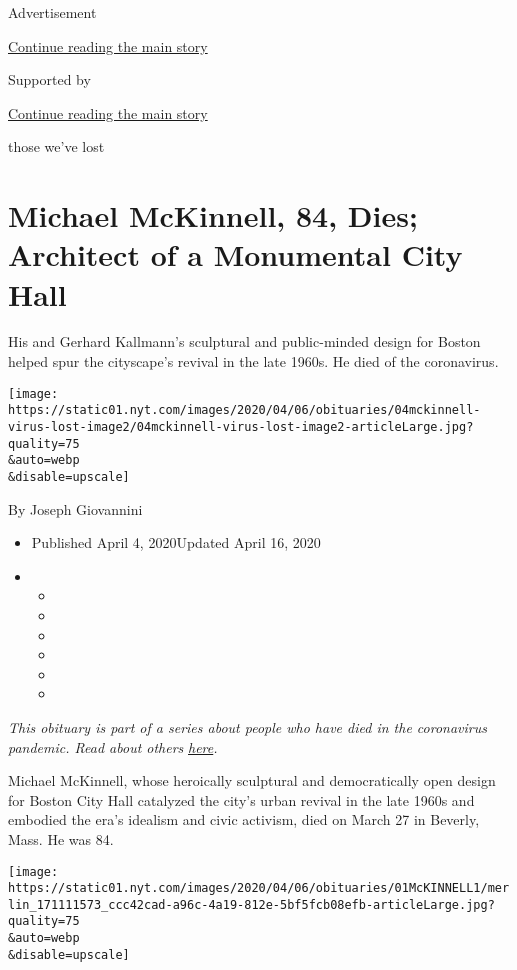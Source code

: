 Advertisement

\protect\hyperlink{after-top}{Continue reading the main story}

Supported by

\protect\hyperlink{after-sponsor}{Continue reading the main story}

those we've lost

\hypertarget{michael-mckinnell-84-dies-architect-of-a-monumental-city-hall}{%
\section{Michael McKinnell, 84, Dies; Architect of a Monumental City
Hall}\label{michael-mckinnell-84-dies-architect-of-a-monumental-city-hall}}

His and Gerhard Kallmann's sculptural and public-minded design for
Boston helped spur the cityscape's revival in the late 1960s. He died of
the coronavirus.

\texttt{[image: https://static01.nyt.com/images/2020/04/06/obituaries/04mckinnell-virus-lost-image2/04mckinnell-virus-lost-image2-articleLarge.jpg?quality=75\\\&auto=webp\\\&disable=upscale]}

By Joseph Giovannini

\begin{itemize}
\item
  Published April 4, 2020Updated April 16, 2020
\item
  \begin{itemize}
  \item
  \item
  \item
  \item
  \item
  \item
  \end{itemize}
\end{itemize}

\emph{This obituary is part of a series about people who have died in
the coronavirus pandemic. Read about others}
\href{https://www.nytimes.com/series/people-who-have-died-of-the-coronavirus}{\emph{here}}\emph{.}

Michael McKinnell, whose heroically sculptural and democratically open
design for Boston City Hall catalyzed the city's urban revival in the
late 1960s and embodied the era's idealism and civic activism, died on
March 27 in Beverly, Mass. He was 84.

\texttt{[image: https://static01.nyt.com/images/2020/04/06/obituaries/01McKINNELL1/merlin\_171111573\_ccc42cad-a96c-4a19-812e-5bf5fcb08efb-articleLarge.jpg?quality=75\\\&auto=webp\\\&disable=upscale]}

